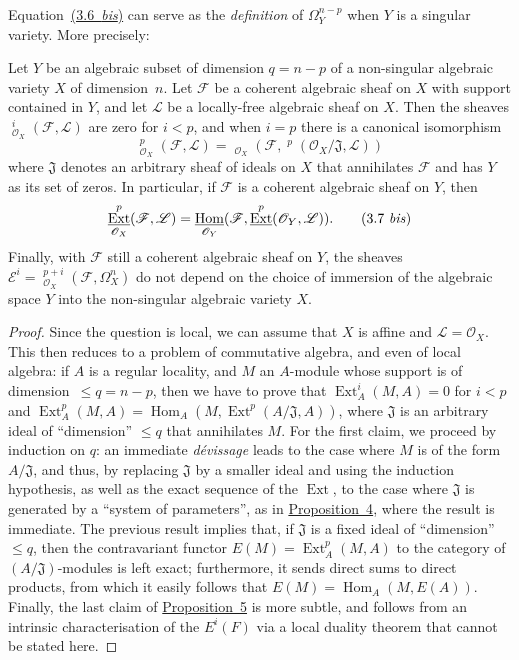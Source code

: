 \documentclass{article}
\theoremstyle{plain}
\newenvironment{proposition}[1]
  {\renewcommand\theinnerproposition{#1}\innerproposition}
  {\endinnerproposition}
\theoremstyle{definition}
\newcommand{\scr}[1]{{\mathscr{#1}}}
\renewcommand{\leq}{\leqslant}
\DeclareMathOperator{\Ext}{Ext}
\DeclareMathOperator{\Hom}{Hom}
\DeclareMathOperator{\shExt}{\underline{Ext}}
\DeclareMathOperator{\shHom}{\underline{Hom}}
\newcommand{\oldpage}[1]{\marginpar{\footnotesize$\Big\vert$ \textit{p.~#1}}}
\begin{document}
Equation~\hyperref[3.6bis]{(3.6~\emph{bis})} can serve as the \emph{definition} of $\Omega_Y^{n-p}$ when $Y$ is a singular variety.
More precisely:

\begin{proposition}{5}
\label{proposition5}
  Let $Y$ be an algebraic subset of dimension $q=n-p$ of a non-singular algebraic variety $X$ of dimension~$n$.
  Let $\scr{F}$ be a coherent algebraic sheaf on $X$ with support contained in $Y$, and let $\scr{L}$ be a locally-free algebraic sheaf on $X$.
  Then the sheaves $\shExt_{\scr{O}_X}^i(\scr{F},\scr{L})$ are zero for $i<p$, and when $i=p$ there is a canonical isomorphism
  \[
  \label{3.7}
    \shExt_{\scr{O}_X}^p(\scr{F},\scr{L}) = \shHom_{\scr{O}_X}(\scr{F},\shExt^p(\scr{O}_X/\mathfrak{J},\scr{L}))
  \tag{3.7}
  \]
  where $\mathfrak{J}$ denotes an arbitrary sheaf of ideals on $X$ that annihilates $\scr{F}$ and has $Y$ as its set of zeros.
  In particular, if $\scr{F}$ is a coherent algebraic sheaf on $Y$, then
  \[
  \label{3.7bis}
    \shExt_{\scr{O}_X}^p(\scr{F},\scr{L}) = \shHom_{\scr{O}_Y}(\scr{F},\shExt^p(\scr{O}_Y,\scr{L})).
  \tag{3.7 \emph{bis}}
  \]
  Finally, with $\scr{F}$ still a coherent algebraic sheaf on $Y$, the sheaves $\scr{E}^i=\shExt_{\scr{O}_X}^{p+i}(\scr{F},\Omega_X^n)$ do not depend on the choice of immersion of the algebraic space $Y$ into the non-singular algebraic variety $X$.
\end{proposition}

\begin{proof}
  Since the question is local, we can assume that $X$ is affine and $\scr{L}=\scr{O}_X$.
  This then reduces to a problem of commutative algebra, and even of local algebra:
  if $A$ is a regular locality, and $M$ an $A$-module whose support is of dimension~$\leq q=n-p$, then we have to prove that $\Ext_A^i(M,A)=0$ for $i<p$ and $\Ext_A^p(M,A)=\Hom_A(M,\Ext^p(A/\mathfrak{J},A))$, where $\mathfrak{J}$ is an arbitrary ideal of ``dimension'' $\leq q$ that annihilates $M$.
  For the first claim, we proceed by induction on $q$:
  an immediate \emph{d\'{e}vissage} leads to the case where $M$ is of the form $A/\mathfrak{J}$, and thus, by replacing $\mathfrak{J}$ by a smaller ideal and using the induction hypothesis, as well as the exact sequence of the $\Ext$, to the case where $\mathfrak{J}$ is generated by a ``system of parameters'', as in \hyperref[proposition4]{Proposition~4}, where the result is immediate.
  The previous result implies that, if $\mathfrak{J}$ is a
\oldpage{149-09}
  fixed ideal of ``dimension'' $\leq q$, then the contravariant functor $E(M)=\Ext_A^p(M,A)$ to the category of $(A/\mathfrak{J})$-modules is left exact;
  furthermore, it sends direct sums to direct products, from which it easily follows that $E(M)=\Hom_A(M,E(A))$.
  Finally, the last claim of \hyperref[proposition5]{Proposition~5} is more subtle, and follows from an intrinsic characterisation of the $E^i(F)$ via a local duality theorem that cannot be stated here.
\end{proof}
\end{document}
